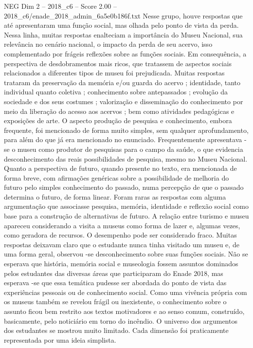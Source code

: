 \begin{textsample}{NEG Dim 2 – 2018\_c6 – Score 2.00 – 2018\_c6/enade\_2018\_admin\_6a5e0b186f.txt}
Nesse grupo, houve respostas que até apresentaram uma função social, mas olhada pelo ponto de vista da perda.
Nessa linha, muitas respostas enalteciam a importância do Museu Nacional, sua relevância no cenário nacional, o impacto da perda de seu acervo, isso complementado por frágeis reflexões sobre as funções sociais.
Em consequência, a perspectiva de desdobramentos mais ricos, que tratassem de aspectos sociais relacionados a diferentes tipos de museu foi prejudicada.
Muitas respostas trataram da preservação da memória e/ou guarda do acervo ; identidade, tanto individual quanto coletiva ; conhecimento sobre antepassados ; evolução da sociedade e dos seus costumes ; valorização e disseminação do conhecimento por meio da liberação do acesso aos acervos ; bem como atividades pedagógicas e exposições de arte.
O aspecto produção de pesquisa e conhecimento, embora frequente, foi mencionado de forma muito simples, sem qualquer aprofundamento, para além do que já era mencionado no enunciado.
Frequentemente apresentava -se o museu como produtor de pesquisas para o campo da saúde, o que evidencia desconhecimento das reais possibilidades de pesquisa, mesmo no Museu Nacional.
Quanto a perspectiva de futuro, quando presente no texto, era mencionada de forma breve, com afirmações genéricas sobre a possibilidade de melhoria do futuro pelo simples conhecimento do passado, numa percepção de que o passado determina o futuro, de forma linear.
Foram raras as respostas com alguma argumentação que associasse pesquisa, memória, identidade e reflexão social como base para a construção de alternativas de futuro.
A relação entre turismo e museu apareceu considerando a visita a museus como forma de lazer e, algumas vezes, como geradora de recursos.
O desempenho pode ser considerado fraco.
Muitas respostas deixavam claro que o estudante nunca tinha visitado um museu e, de uma forma geral, observou -se desconhecimento sobre suas funções sociais.
Não se esperava que história, memória social e museologia fossem assuntos dominados pelos estudantes das diversas áreas que participaram do Enade 2018, mas esperava -se que essa temática pudesse ser abordada do ponto de vista das experiências pessoais ou de conhecimento social.
Como uma vivência própria com os museus também se revelou frágil ou inexistente, o conhecimento sobre o assunto ficou bem restrito aos textos motivadores e ao senso comum, construído, basicamente, pelo noticiário em torno do incêndio.
O universo dos argumentos dos estudantes se mostrou muito limitado.
Cada dimensão foi praticamente representada por uma ideia simplista.

\end{textsample}
